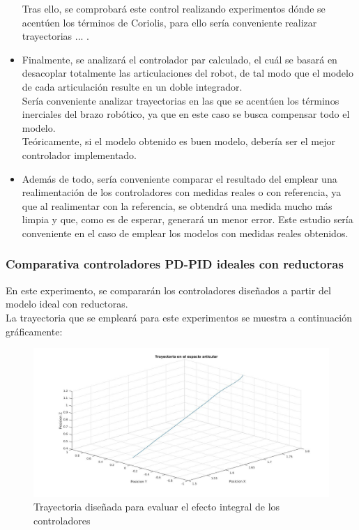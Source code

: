 \begin{itemize}
	Tras ello, se comprobará este control realizando experimentos dónde se acentúen los términos de Coriolis, para ello sería conveniente realizar trayectorias ... .\\
	
	
	
	\item Finalmente, se analizará el controlador par calculado, el cuál se basará en desacoplar totalmente las articulaciones del robot, de tal modo que el modelo de cada articulación resulte en un doble integrador.\\
	
	Sería conveniente analizar trayectorias en las que se acentúen los términos inerciales del brazo robótico, ya que en este caso se busca compensar todo el modelo.\\
	
	Teóricamente, si el modelo obtenido es buen modelo, debería ser el mejor controlador implementado.\\
	
	
	
	\item Además de todo, sería conveniente comparar el resultado del emplear una realimentación de los controladores con medidas reales o con referencia, ya que al realimentar con la referencia, se obtendrá una medida mucho más limpia y que, como es de esperar, generará un menor error. Este estudio sería conveniente en el caso de emplear los modelos con medidas reales obtenidos.\\
	
\end{itemize}


\subsubsection{Comparativa controladores PD-PID ideales con reductoras}

En este experimento, se compararán los controladores diseñados a partir del modelo ideal con reductoras. \\

La trayectoria que se empleará para este experimentos se muestra a continuación gráficamente:

\begin{figure}[h!]
	
	\centering
	
	\includegraphics[width=.8\textwidth]{exp1_tray}
	
	\caption{Trayectoria diseñada para evaluar el efecto integral de los controladores}
	
\end{figure}



